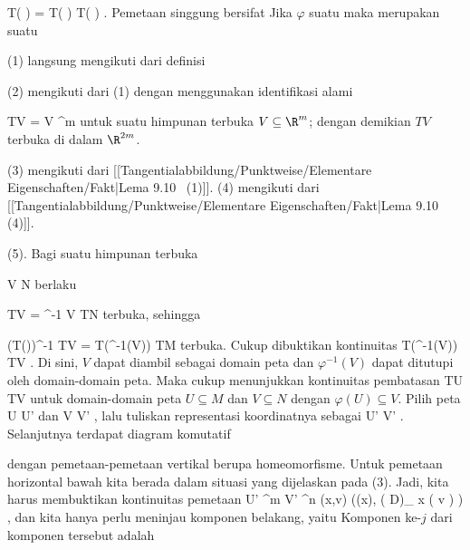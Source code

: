 {{{\mavergleichskettedisp
{\vergleichskette
{ T( \varphi \circ \psi)
}
{ =} { T( \varphi) \circ T( \psi)
}
{ } {
}
{ } {
}
{ } {
}
}
{}{}{.}
}{Pemetaan singgung
bersifat
}{Jika $\varphi$ suatu
maka
merupakan suatu
}}
\faktzusatz {}
\faktzusatz {}

}
{

\teilbeweis {}{}{}
{(1) langsung mengikuti dari definisi
}
{}
\teilbeweis {}{}{}
{(2) mengikuti dari (1) dengan menggunakan identifikasi alami

\mavergleichskette
{\vergleichskette
{ TV
}
{ = }{ V \times \R^m
}
{  }{
}
{    }{
}
{   }{
}
}
{}{}{}
untuk suatu himpunan terbuka $V\subseteq\R^m$; dengan demikian $TV$ terbuka di dalam $\R^{2m}$.}
{}
\teilbeweis {}{}{}
{(3) mengikuti dari
[[Tangentialabbildung/Punktweise/Elementare Eigenschaften/Fakt|Lema 9.10  (1)]].}
{}
\teilbeweis {}{}{}
{(4) mengikuti dari
[[Tangentialabbildung/Punktweise/Elementare Eigenschaften/Fakt|Lema 9.10  (4)]].}
{}
\teilbeweis {}{}{}
{(5). Bagi suatu himpunan terbuka

\mavergleichskettedisp
{\vergleichskette
{ V
}
{ \subseteq} { N
}
{ } {
}
{ } {
}
{ } {
}
}
{}{}{}
berlaku

\mavergleichskette
{\vergleichskette
{ TV
}
{ = }{ \pi^{-1} V
}
{ \subseteq }{ TN
}
{    }{
}
{   }{
}
}
{}{}{}
terbuka, sehingga

\mavergleichskette
{\vergleichskette
{ (T(\varphi))^{-1} TV
}
{ = }{ T(\varphi^{-1}(V))
}
{ \subseteq }{ TM
}
{    }{
}
{   }{
}
}
{}{}{}
terbuka. Cukup dibuktikan kontinuitas
\maabbdisp {} {T(\varphi^{-1}(V))} {TV
} {}
.
Di sini, $V$ dapat diambil sebagai domain peta dan $\varphi^{-1}(V)$ dapat ditutupi oleh domain-domain peta. Maka cukup menunjukkan kontinuitas pembatasan
 {TU} {TV
} {}
untuk domain-domain peta $U\subseteq M$ dan $V\subseteq N$ dengan $\varphi(U)\subseteq V$. Pilih peta
\maabb {\alpha} {U} {U'
} {}
dan
\maabbdisp {\beta} {V} {V'
} {,}
lalu tuliskan representasi koordinatnya sebagai
 {U'} {V'
} {.}
Selanjutnya terdapat diagram komutatif

 {  }
 dengan pemetaan-pemetaan vertikal berupa homeomorfisme. Untuk pemetaan horizontal bawah kita berada dalam situasi yang dijelaskan pada (3). Jadi, kita harus membuktikan kontinuitas pemetaan
 {U' \times \R^m } { V' \times \R^n
} {(x,v)} {(\widetilde\varphi(x), \left(  D\widetilde\varphi  \right)_{ x } \left(  v  \right) )
} {,}
dan kita hanya perlu meninjau komponen belakang, yaitu
Komponen ke-$j$ dari komponen tersebut adalah

}}
